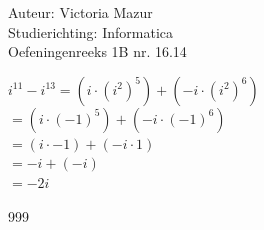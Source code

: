 \documentclass[a4paper]{article}
\begin{document}
  
\noindent \large Auteur: Victoria Mazur \\
\noindent \large Studierichting: Informatica\\
\noindent \large Oefeningenreeks 1B nr. 16.14\\

\medskip

\normalsize

$i^{11} - i^{13} = \left(i \cdot (i^2)^5\right) + \left(-i \cdot (i^2)^6\right)$ \\

$= \left(i \cdot (-1)^5\right) + \left(-i \cdot (-1)^6\right)$ \\

$= (i \cdot -1) + (-i \cdot 1)$ \\

$= -i + (-i)$ \\

$= -2i$ \\

\begin{thebibliography}{999}
\end{thebibliography}
\end{document}
